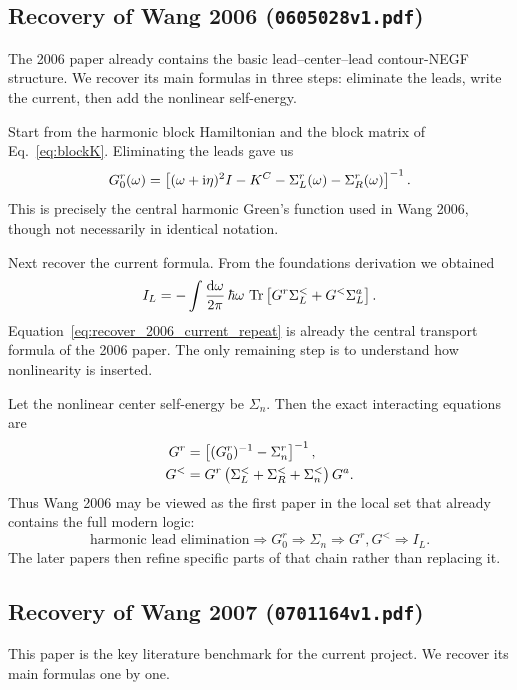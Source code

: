 \subsection{Recovery of Wang 2006 (\texttt{0605028v1.pdf})}
The 2006 paper already contains the basic lead--center--lead contour-NEGF structure. We recover its main formulas in three steps: eliminate the leads, write the current, then add the nonlinear self-energy.

Start from the harmonic block Hamiltonian and the block matrix of Eq.~\eqref{eq:blockK}. Eliminating the leads gave us
\begin{equation}
    G_0^r(\omega)
    =
    \left[ (\omega+\mathrm{i}\eta)^2I - K^C - \Sigma_L^r(\omega) - \Sigma_R^r(\omega) \right]^{-1}.
    \label{eq:recover_2006_G0r}
\end{equation}
This is precisely the central harmonic Green's function used in Wang 2006, though not necessarily in identical notation.

Next recover the current formula. From the foundations derivation we obtained
\begin{equation}
    I_L = -\int \frac{\mathrm{d}\omega}{2\pi}\,\hbar\omega\,\operatorname{Tr}\left[ G^r\Sigma_L^< + G^<\Sigma_L^a \right].
    \label{eq:recover_2006_current_repeat}
\end{equation}
Equation~\eqref{eq:recover_2006_current_repeat} is already the central transport formula of the 2006 paper. The only remaining step is to understand how nonlinearity is inserted.

Let the nonlinear center self-energy be $\Sigma_n$. Then the exact interacting equations are
\begin{align}
    G^r &= \left[ (G_0^r)^{-1} - \Sigma_n^r \right]^{-1}, \\
    G^< &= G^r\left( \Sigma_L^< + \Sigma_R^< + \Sigma_n^< \right)G^a.
    \label{eq:recover_2006_interacting_pair}
\end{align}
Thus Wang 2006 may be viewed as the first paper in the local set that already contains the full modern logic:
\begin{equation}
    \text{harmonic lead elimination}
    \Rightarrow
    G_0^r
    \Rightarrow
    \Sigma_n
    \Rightarrow
    G^r,G^<
    \Rightarrow
    I_L.
\end{equation}
The later papers then refine specific parts of that chain rather than replacing it.

\subsection{Recovery of Wang 2007 (\texttt{0701164v1.pdf})}
This paper is the key literature benchmark for the current project. We recover its main formulas one by one.

